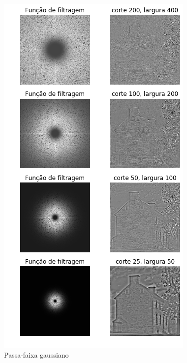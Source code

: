 \documentclass{article}
\begin{document}
\begin{figure}[h!]
    \includegraphics[width=\linewidth]{results/exercicio2passa_faixa.png}
    \caption{Passa-faixa gaussiano}
    \label{fig:exercicio23}
\end{figure}
\end{document}
